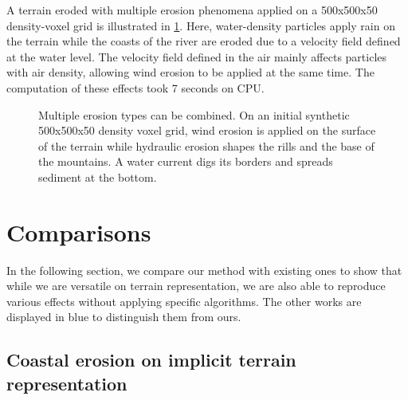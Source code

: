 A terrain eroded with multiple erosion phenomena applied on a 500x500x50 density-voxel grid is illustrated in \cref{fig:erosion-multiErosions}. Here, water-density particles apply rain on the terrain while the coasts of the river are eroded due to a velocity field defined at the water level. The velocity field defined in the air mainly affects particles with air density, allowing wind erosion to be applied at the same time. The computation of these effects took 7 seconds on CPU.

\begin{figure}
    \caption{Multiple erosion types can be combined. On an initial synthetic 500x500x50 density voxel grid, wind erosion is applied on the surface of the terrain while hydraulic erosion shapes the rills and the base of the mountains. A water current digs its borders and spreads sediment at the bottom.}
    \label{fig:erosion-multiErosions}
\end{figure}

\section{Comparisons}

In the following section, we compare our method with existing ones to show that while we are versatile on terrain representation, we are also able to reproduce various effects without applying specific algorithms. The other works are displayed in blue to distinguish them from ours.

\subsection{Coastal erosion on implicit terrain representation}

